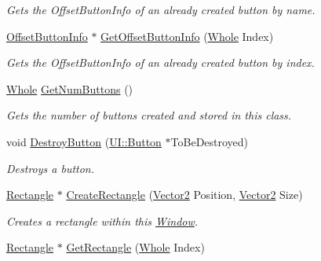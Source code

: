 \begin{DoxyCompactItemize}
\begin{DoxyCompactList}\small\item\em Gets the OffsetButtonInfo of an already created button by name. \item\end{DoxyCompactList}\item 
\hyperlink{structphys_1_1UI_1_1ResizingInfo}{OffsetButtonInfo} $\ast$ \hyperlink{classphys_1_1UI_1_1Window_aca8ae5c3dd73f101e33df8f1a2ff0f27}{GetOffsetButtonInfo} (\hyperlink{namespacephys_a460f6bc24c8dd347b05e0366ae34f34a}{Whole} Index)
\begin{DoxyCompactList}\small\item\em Gets the OffsetButtonInfo of an already created button by index. \item\end{DoxyCompactList}\item 
\hyperlink{namespacephys_a460f6bc24c8dd347b05e0366ae34f34a}{Whole} \hyperlink{classphys_1_1UI_1_1Window_a7eab9b4e1607a2b796072f60b6e3e0cd}{GetNumButtons} ()
\begin{DoxyCompactList}\small\item\em Gets the number of buttons created and stored in this class. \item\end{DoxyCompactList}\item 
void \hyperlink{classphys_1_1UI_1_1Window_a5a5bc10054d6e1d709b3b683a5554bf4}{DestroyButton} (\hyperlink{classphys_1_1UI_1_1Button}{UI::Button} $\ast$ToBeDestroyed)
\begin{DoxyCompactList}\small\item\em Destroys a button. \item\end{DoxyCompactList}\item 
\hyperlink{classphys_1_1UI_1_1Rectangle}{Rectangle} $\ast$ \hyperlink{classphys_1_1UI_1_1Window_a16bd1a1a35d61c597bca648e127aaf3a}{CreateRectangle} (\hyperlink{classphys_1_1Vector2}{Vector2} Position, \hyperlink{classphys_1_1Vector2}{Vector2} Size)
\begin{DoxyCompactList}\small\item\em Creates a rectangle within this \hyperlink{classphys_1_1UI_1_1Window}{Window}. \item\end{DoxyCompactList}\item 
\hyperlink{classphys_1_1UI_1_1Rectangle}{Rectangle} $\ast$ \hyperlink{classphys_1_1UI_1_1Window_adb076e699dd41c27cb4e60711711fc77}{GetRectangle} (\hyperlink{namespacephys_a460f6bc24c8dd347b05e0366ae34f34a}{Whole} Index)

\end{DoxyCompactItemize}
